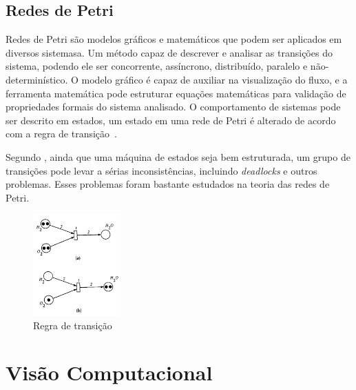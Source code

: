 \subsection{Redes de Petri}

Redes de Petri são modelos gráficos e matemáticos que podem ser aplicados em diversos sistemasa. Um método capaz de descrever e analisar as transições do sistema, podendo ele ser concorrente, assíncrono, distribuído, paralelo e não-determinístico. O modelo gráfico é capaz de auxiliar na visualização do fluxo, e a ferramenta matemática pode estruturar equações matemáticas para validação de propriedades formais do sistema analisado. O comportamento de sistemas pode ser descrito em estados, um estado em uma rede de Petri é alterado de acordo com a regra de transição~\cite{murata:1989}.


Segundo , ainda que uma máquina de estados seja bem estruturada, um grupo de transições pode levar a sérias inconsistências, incluindo \textit{deadlocks} e outros problemas. Esses problemas foram bastante estudados na teoria das redes de Petri. 

 \begin{figure}[H]
	\centering
    	\caption{\label{fig:petri}Regra de transição}
		\includegraphics[width = 0.3\textwidth]	{resources/petri}
\end{figure}


\section{Visão Computacional}

